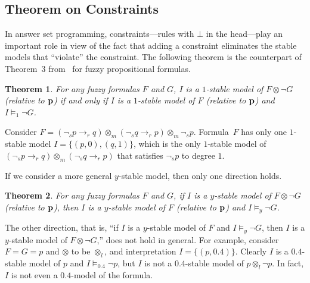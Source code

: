 \documentclass[runningheads]{llncs}
\def\rar{\rightarrow}
\def\fand{\otimes}
\newtheorem{thm}{Theorem}
\begin{document}
\subsection{Theorem on Constraints}

In answer set programming, constraints---rules with $\bot$ in the
head---play an important role in view of the fact that adding a
constraint eliminates the stable models that ``violate'' the
constraint. 
The following theorem is the counterpart of Theorem~3
from~\cite{ferraris11stable} for fuzzy propositional formulas. 

\begin{thm}\label{thm:constraint}
For any fuzzy formulas $F$ and $G$, $I$ is a $1$-stable model of
\hbox{$F\fand\neg G$} (relative to ${\bf p}$) if and only if $I$ is a
$1$-stable model of $F$ (relative to ${\bf p}$) and $I\models_1\neg G$.
\end{thm}

\begin{example}
Consider $F=(\neg_{\!s} p \rar_r q)\fand_m(\neg_{\!s} q \rar_r p)\fand_m \neg_{\!s} p$. Formula~$F$ has only one $1$-stable model $I = \{(p, 0), (q, 1)\}$, which is the only $1$-stable model of \\
\hbox{$(\neg_{\!s} p \rar_r q)\fand_m(\neg_{\!s} q \rar_r p)$} that satisfies $\neg_{\!s} p$ to degree $1$.
\end{example}



If we consider a more general $y$-stable model, then only one
direction holds.

\begin{thm}\label{thm:constraint2} 
For any fuzzy formulas $F$ and $G$, if $I$ is a $y$-stable model of 
$F\fand\neg G$ (relative to ${\bf p}$), then $I$ is a $y$-stable model
of $F$ (relative to ${\bf p}$) and $I\models_y\neg G$.
\end{thm}

\begin{example}
The other direction, that is, ``if $I$ is a $y$-stable model of $F$ and 
$I \models_y\neg G$, then $I$ is a $y$-stable model of $F\fand \neg
G$,'' does not hold in general. For example, consider $F=G=p$ and
$\fand$ to be $\fand_l$, and 
interpretation $I=\{(p,0.4)\}$. 
Clearly $I$ is a $0.4$-stable model of $p$ and $I\models_{0.4} \neg
p$, but $I$ is not a $0.4$-stable model of $p\fand_l \neg p$. In fact, $I$ is not even a $0.4$-model of the formula.
\end{example}
\end{document}

